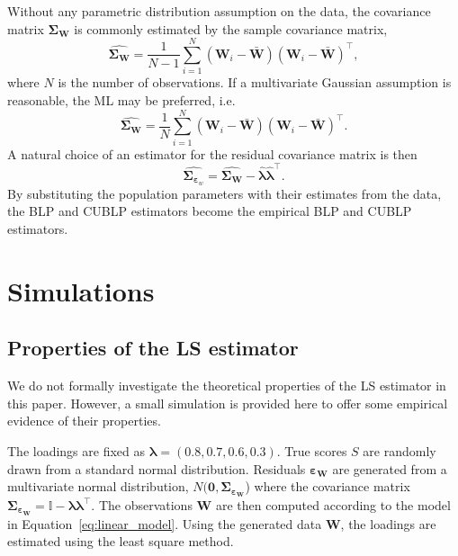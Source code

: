 \documentclass[man, floatsintext]{apa7}
\newcommand{\mbf}[1]{\bm{#1}}
\newcommand{\beps}{\mbf{\varepsilon}}
\newcommand{\blambda}{\mbf{\lambda}}
\newcommand{\bW}{\mbf{W}}
\newcommand{\bsigma}{\mbf{\Sigma}}
\begin{document}
  Without any parametric distribution assumption on the data, the covariance
  matrix $\bsigma_{\bW}$ is commonly estimated by the sample covariance matrix,
  \begin{equation}
    \hat{\bsigma_{\bW}} = \frac{1}{N-1}\sum_{i = 1}^{N}(\bW_{i} - \bar{\bW})
    (\bW_{i} - \bar{\bW})^\top,
  \end{equation} 
  where $N$ is the number of observations. If a multivariate Gaussian assumption
  is reasonable, the ML may be preferred, i.e.
  \begin{equation}
    \hat{\bsigma_{\bW}} = \frac{1}{N}\sum_{i = 1}^{N}(\bW_{i} - \bar{\bW})
    (\bW_{i} - \bar{\bW})^\top.
  \end{equation}
  A natural choice of an estimator for the residual covariance matrix is then 
  \begin{equation}
    \hat{\mbf{\Sigma}_{\beps_w}} = \hat{\mbf{\Sigma}_{\bW}} - \hat{\blambda} 
    \hat{\blambda}^\top.
  \end{equation}
  By substituting the population parameters with their estimates from the data,
  the BLP and CUBLP estimators become the empirical BLP and CUBLP estimators.

  \section{Simulations}
  \subsection{Properties of the LS estimator}
  We do not formally investigate the theoretical properties of the LS estimator
  in this paper. However, a small simulation is provided here to offer some
  empirical evidence of their properties. 

  The loadings are fixed as $\blambda = (0.8, 0.7, 0.6, 0.3)$. True scores $S$
  are randomly drawn from a standard normal distribution. Residuals
  $\mbf{\varepsilon}_{\bW}$ are generated from a multivariate normal
  distribution, $N(\mbf{0}, \bsigma_{\mbf{\varepsilon}_{\bW}}$) where the
  covariance matrix $\bsigma_{\mbf{\varepsilon}_{\bW}} = \mathbb{I} - \blambda
  \blambda^\top$. The observations $\bW$ are then computed according to the
  model in Equation~\ref{eq:linear_model}. Using the generated data $\bW$, the
  loadings are estimated using the least square method. 
\end{document}
